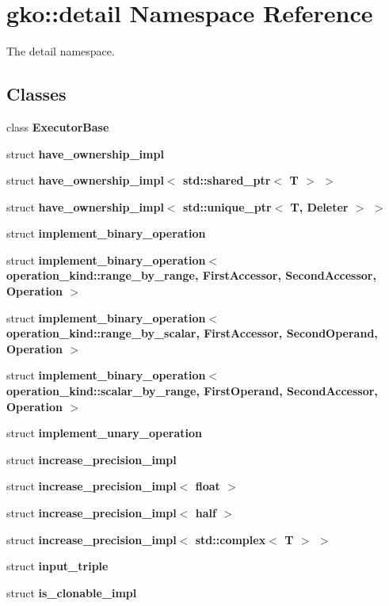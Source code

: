 \hypertarget{namespacegko_1_1detail}{}\section{gko\+:\+:detail Namespace Reference}
\label{namespacegko_1_1detail}


The detail namespace.  


\subsection*{Classes}
\begin{DoxyCompactItemize}
\item 
class {\bfseries Executor\+Base}
\item 
struct {\bfseries have\+\_\+ownership\+\_\+impl}
\item 
struct {\bfseries have\+\_\+ownership\+\_\+impl$<$ std\+::shared\+\_\+ptr$<$ T $>$ $>$}
\item 
struct {\bfseries have\+\_\+ownership\+\_\+impl$<$ std\+::unique\+\_\+ptr$<$ T, Deleter $>$ $>$}
\item 
struct {\bfseries implement\+\_\+binary\+\_\+operation}
\item 
struct {\bfseries implement\+\_\+binary\+\_\+operation$<$ operation\+\_\+kind\+::range\+\_\+by\+\_\+range, First\+Accessor, Second\+Accessor, Operation $>$}
\item 
struct {\bfseries implement\+\_\+binary\+\_\+operation$<$ operation\+\_\+kind\+::range\+\_\+by\+\_\+scalar, First\+Accessor, Second\+Operand, Operation $>$}
\item 
struct {\bfseries implement\+\_\+binary\+\_\+operation$<$ operation\+\_\+kind\+::scalar\+\_\+by\+\_\+range, First\+Operand, Second\+Accessor, Operation $>$}
\item 
struct {\bfseries implement\+\_\+unary\+\_\+operation}
\item 
struct {\bfseries increase\+\_\+precision\+\_\+impl}
\item 
struct {\bfseries increase\+\_\+precision\+\_\+impl$<$ float $>$}
\item 
struct {\bfseries increase\+\_\+precision\+\_\+impl$<$ half $>$}
\item 
struct {\bfseries increase\+\_\+precision\+\_\+impl$<$ std\+::complex$<$ T $>$ $>$}
\item 
struct {\bfseries input\+\_\+triple}
\item 
struct {\bfseries is\+\_\+clonable\+\_\+impl}
\item 

\end{DoxyCompactItemize}
